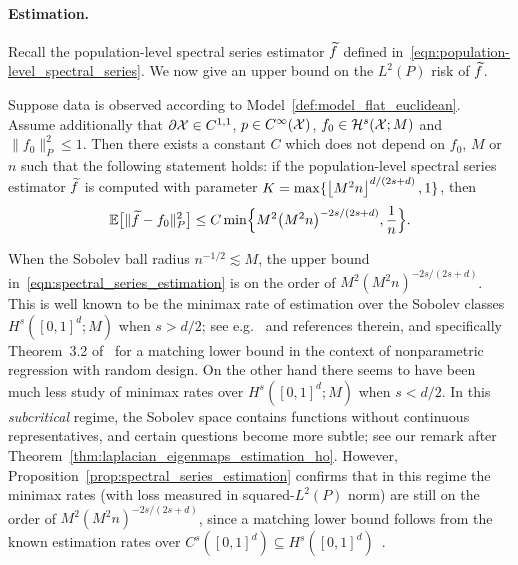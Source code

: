 \paragraph{Estimation.}
Recall the population-level spectral series estimator $\widetilde{f}$ defined in~\eqref{eqn:population-level_spectral_series}. We now give an upper bound on the $L^2(P)$ risk of $\widetilde{f}$.
\begin{proposition}
	\label{prop:spectral_series_estimation}
	Suppose data is observed according to Model~\ref{def:model_flat_euclidean}. Assume additionally that $\partial \mathcal{X} \in C^{1,1}$, $p \in C^{\infty}(\mathcal{X})$, $f_0 \in \mathcal{H}^{s}(\mathcal{X};M)$ and $\|f_0\|_P^2 \leq 1$. Then there exists a constant $C$ which does not depend on $f_0$, $M$ or $n$ such that the following statement holds: if the population-level spectral series estimator $\widetilde{f}$ is computed with parameter $K = \max\{\left\lfloor M^2n \right\rfloor^{d/(2s + d)},1\}$, then
	\begin{equation}
	\label{eqn:spectral_series_estimation}
	\mathbb{E}\bigl[\|\widetilde{f} - f_0\|_P^2\bigr] \leq C \min\Bigl\{M^2\bigl(M^2n\bigr)^{-2s/(2s + d)}, \frac{1}{n}\Bigr\}.
	\end{equation}
\end{proposition}
When the Sobolev ball radius $n^{-1/2} \lesssim M$, the upper bound in~\eqref{eqn:spectral_series_estimation} is on the order of $M^2(M^2n)^{-2s/(2s + d)}$. This is well known to be the minimax rate of estimation over the Sobolev classes $H^s([0,1]^d;M)$ when $s > d/2$; see e.g.~\cite{gyorfi2006,wasserman2006,tsybakov08} and references therein, and specifically Theorem~3.2 of~\cite{gyorfi2006} for a matching lower bound in the context of nonparametric regression with random design. On the other hand there seems to have been much less study of minimax rates over $H^s([0,1]^d;M)$ when $s < d/2$. In this \emph{subcritical} regime, the Sobolev space contains functions without continuous representatives, and certain questions become more subtle; see our remark after Theorem~\ref{thm:laplacian_eigenmaps_estimation_ho}. However, Proposition~\ref{prop:spectral_series_estimation} confirms that in this regime the minimax rates (with loss measured in squared-$L^2(P)$ norm) are still on the order of $M^2(M^2n)^{-2s/(2s + d)}$, since a matching lower bound follows from the known estimation rates over $C^s([0,1]^d) \subseteq H^s([0,1]^d)$~\citep{stone1980}.

